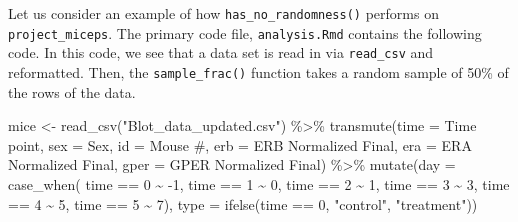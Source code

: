 \documentclass[12pt,twoside]{reedthesis}
\newenvironment{Shaded}{\begin{snugshade}}{\end{snugshade}}
\newcommand{\AttributeTok}[1]{\textcolor[rgb]{0.77,0.63,0.00}{#1}}
\newcommand{\DecValTok}[1]{\textcolor[rgb]{0.00,0.00,0.81}{#1}}
\newcommand{\FunctionTok}[1]{\textcolor[rgb]{0.00,0.00,0.00}{#1}}
\newcommand{\NormalTok}[1]{#1}
\newcommand{\OtherTok}[1]{\textcolor[rgb]{0.56,0.35,0.01}{#1}}
\newcommand{\SpecialCharTok}[1]{\textcolor[rgb]{0.00,0.00,0.00}{#1}}
\newcommand{\StringTok}[1]{\textcolor[rgb]{0.31,0.60,0.02}{#1}}
\begin{document}
Let us consider an example of how \texttt{has\_no\_randomness()} performs on \texttt{project\_miceps}. The primary code file, \texttt{analysis.Rmd} contains the following code. In this code, we see that a data set is read in via \texttt{read\_csv} and reformatted. Then, the \texttt{sample\_frac()} function takes a random sample of 50\% of the rows of the data.
\begin{Shaded}
\begin{Highlighting}[]
\NormalTok{mice }\OtherTok{\textless{}{-}} \FunctionTok{read\_csv}\NormalTok{(}\StringTok{"Blot\_data\_updated.csv"}\NormalTok{) }\SpecialCharTok{\%\textgreater{}\%}
  \FunctionTok{transmute}\NormalTok{(}\AttributeTok{time =} \StringTok{\textasciigrave{}}\AttributeTok{Time point}\StringTok{\textasciigrave{}}\NormalTok{,}
            \AttributeTok{sex =}\NormalTok{ Sex, }
            \AttributeTok{id =} \StringTok{\textasciigrave{}}\AttributeTok{Mouse \#}\StringTok{\textasciigrave{}}\NormalTok{, }
            \AttributeTok{erb =} \StringTok{\textasciigrave{}}\AttributeTok{ERB Normalized Final}\StringTok{\textasciigrave{}}\NormalTok{, }
            \AttributeTok{era =} \StringTok{\textasciigrave{}}\AttributeTok{ERA Normalized Final}\StringTok{\textasciigrave{}}\NormalTok{, }
            \AttributeTok{gper =} \StringTok{\textasciigrave{}}\AttributeTok{GPER Normalized Final}\StringTok{\textasciigrave{}}\NormalTok{) }\SpecialCharTok{\%\textgreater{}\%}
  \FunctionTok{mutate}\NormalTok{(}\AttributeTok{day =} \FunctionTok{case\_when}\NormalTok{(}
\NormalTok{    time }\SpecialCharTok{==} \DecValTok{0} \SpecialCharTok{\textasciitilde{}} \SpecialCharTok{{-}}\DecValTok{1}\NormalTok{,}
\NormalTok{    time }\SpecialCharTok{==} \DecValTok{1} \SpecialCharTok{\textasciitilde{}} \DecValTok{0}\NormalTok{,}
\NormalTok{    time }\SpecialCharTok{==} \DecValTok{2} \SpecialCharTok{\textasciitilde{}} \DecValTok{1}\NormalTok{,}
\NormalTok{    time }\SpecialCharTok{==} \DecValTok{3} \SpecialCharTok{\textasciitilde{}} \DecValTok{3}\NormalTok{,}
\NormalTok{    time }\SpecialCharTok{==} \DecValTok{4} \SpecialCharTok{\textasciitilde{}} \DecValTok{5}\NormalTok{,}
\NormalTok{    time }\SpecialCharTok{==} \DecValTok{5} \SpecialCharTok{\textasciitilde{}} \DecValTok{7}\NormalTok{),}
  \AttributeTok{type =} \FunctionTok{ifelse}\NormalTok{(time }\SpecialCharTok{==} \DecValTok{0}\NormalTok{, }\StringTok{"control"}\NormalTok{, }\StringTok{"treatment"}\NormalTok{))}


\end{Highlighting}
\end{Shaded}
\end{document}
